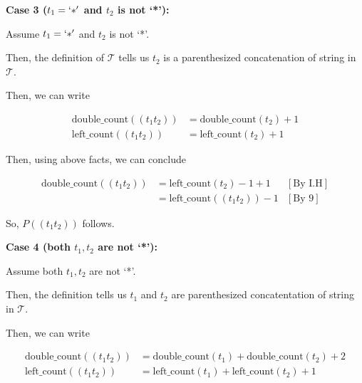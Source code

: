 \documentclass[12pt]{article}
\begin{document}
\begin{enumerate}[a.]
    \textbf{Case 3 ($t_1 = `*'$ and $t_2$ is not `*'):}

    \bigskip

    Assume $t_1 = `*'$ and $t_2$ is not `*'.

    \bigskip

    Then, the definition of $\mathcal{T}$ tells us $t_2$ is a parenthesized
    concatenation of string in $\mathcal{T}$.

    \bigskip

    Then, we can write

    \bigskip

    \begin{align}
        \text{double\_count}((t_1t_2)) &= \text{double\_count}(t_2) + 1\\
        \text{left\_count}((t_1t_2)) &= \text{left\_count}(t_2) + 1
    \end{align}

    \bigskip

    Then, using above facts, we can conclude

    \begin{align}
        \text{double\_count}((t_1t_2)) &= \text{left\_count}(t_2) - 1 + 1 & [\text{By I.H}]\\
        &= \text{left\_count}((t_1t_2)) - 1 & [\text{By 9}]
    \end{align}

    \bigskip

    So, $P((t_1t_2))$ follows.

    \bigskip

    \textbf{Case 4 (both $t_1,t_2$ are not `*'):}

    \bigskip

    Assume both $t_1,t_2$ are not `*'.

    \bigskip

    Then, the definition tells us $t_1$ and $t_2$ are
    parenthesized concatentation of string in $\mathcal{T}$.

    \bigskip

    Then, we can write

    \begin{align}
        \text{double\_count}((t_1t_2)) &= \text{double\_count}(t_1) + \text{double\_count}(t_2) + 2\\
        \text{left\_count}((t_1t_2)) &= \text{left\_count}(t_1) + \text{left\_count}(t_2) + 1
    \end{align}

    \bigskip


\end{enumerate}
\end{document}
